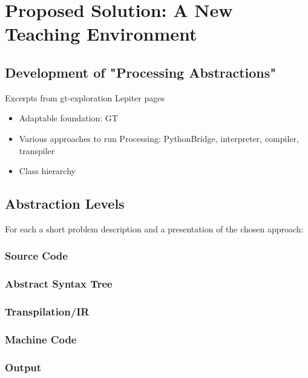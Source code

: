 
\chapter{Proposed Solution: A New Teaching Environment} \label{ch_pa}

\section{Development of "Processing Abstractions"}
Excerpts from gt-exploration Lepiter pages

\begin{itemize}
\item Adaptable foundation: GT
\item Various approaches to run Processing: PythonBridge, interpreter, compiler, transpiler
\item Class hierarchy
\end{itemize}


\section{Abstraction Levels}
For each a short problem description and a presentation of the chosen approach:

\subsection{Source Code}
\subsection{Abstract Syntax Tree}
\subsection{Transpilation/IR}
\subsection{Machine Code}
\subsection{Output}
